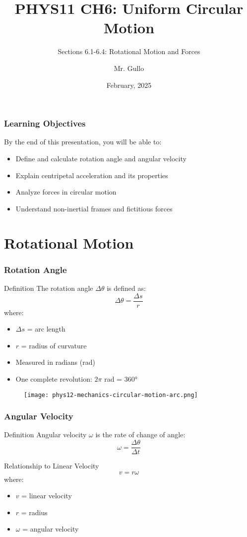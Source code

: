 \documentclass{beamer}
\title[Circular Motion]{PHYS11 CH6: Uniform Circular Motion}
\subtitle{Sections 6.1-6.4: Rotational Motion and Forces}
\author[Mr. Gullo]{Mr. Gullo}
\date[Feb 2025]{February, 2025}
\institute{Physics Department}
\begin{document}
\frame{\titlepage}

\begin{frame}
\frametitle{Learning Objectives}
\begin{block}{By the end of this presentation, you will be able to:}
\begin{itemize}
\item Define and calculate rotation angle and angular velocity
\item Explain centripetal acceleration and its properties
\item Analyze forces in circular motion
\item Understand non-inertial frames and fictitious forces
\end{itemize}
\end{block}
\end{frame}

\section{Rotational Motion}

\begin{frame}
\frametitle{Rotation Angle}
\begin{block}{Definition}
The rotation angle $\Delta\theta$ is defined as:
\[ \Delta\theta = \frac{\Delta s}{r} \]
where:
\begin{itemize}
\item $\Delta s$ = arc length
\item $r$ = radius of curvature
\end{itemize}
\end{block}
\begin{itemize}
\item Measured in radians (rad)
\item One complete revolution: $2\pi$ rad = 360°
\end{itemize}
\end{frame}

\begin{frame}
\begin{figure}
    \centering
    \texttt{[image: phys12-mechanics-circular-motion-arc.png]}
\end{figure}
\end{frame}

\begin{frame}
\frametitle{Angular Velocity}
\begin{block}{Definition}
Angular velocity $\omega$ is the rate of change of angle:
\[ \omega = \frac{\Delta\theta}{\Delta t} \]
\end{block}
\begin{block}{Relationship to Linear Velocity}
\[ v = r\omega \]
where:
\begin{itemize}
\item $v$ = linear velocity
\item $r$ = radius
\item $\omega$ = angular velocity
\end{itemize}
\end{block}
\end{frame}
\end{document}
